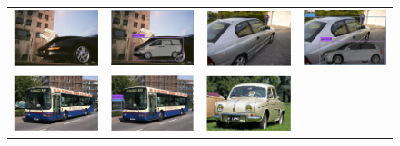 \documentclass[10pt,twocolumn,letterpaper]{article}
\begin{document}
\begin{figure}[h]
\setlength\tabcolsep{1pt}
\centering
\begin{tabular}{|cc|cc|}
  \hline
  \includegraphics[width=0.22\linewidth]{supp/pas_car8a.png} &
  \includegraphics[width=0.22\linewidth]{supp/pas_car8b.png} & 
  \includegraphics[width=0.22\linewidth]{supp/pas_car9a.png} &
  \includegraphics[width=0.22\linewidth]{supp/pas_car9b.png} \\ 
  \includegraphics[width=0.22\linewidth]{supp/pas_car11a.png} &
  \includegraphics[width=0.22\linewidth]{supp/pas_car11b.png} & 
  \includegraphics[width=0.22\linewidth]{supp/pas_car12a.png} &

\end{tabular}
\end{figure}
\end{document}
